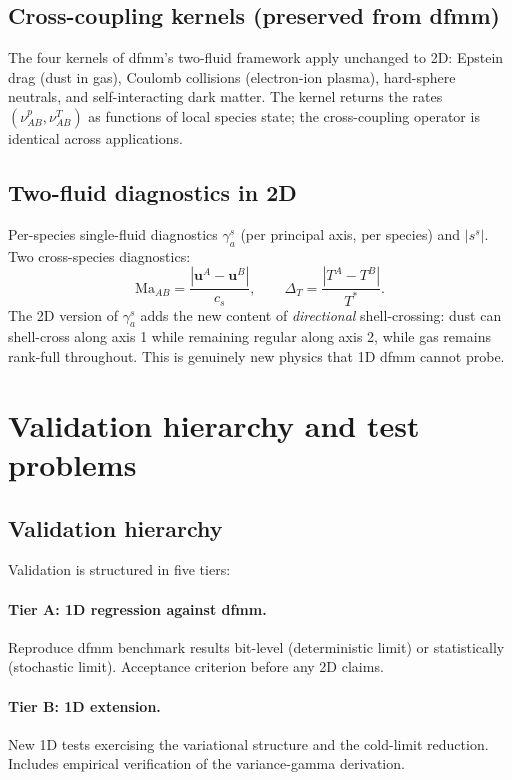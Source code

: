 \documentclass[11pt]{article}
\newcommand{\Ma}{\mathrm{Ma}}
\newcommand{\bu}{\bm{u}}
\begin{document}
\subsection{Cross-coupling kernels (preserved from dfmm)}

The four kernels of dfmm's two-fluid framework apply unchanged to 2D:
Epstein drag (dust in gas), Coulomb collisions (electron-ion plasma),
hard-sphere neutrals, and self-interacting dark matter. The kernel
returns the rates $(\nu^p_{AB}, \nu^T_{AB})$ as functions of local
species state; the cross-coupling operator is identical across
applications.

\subsection{Two-fluid diagnostics in 2D}

Per-species single-fluid diagnostics $\gamma_a^s$ (per principal
axis, per species) and $|s^s|$. Two cross-species diagnostics:
\begin{equation}
  \Ma_{AB} = \frac{|\bu^A - \bu^B|}{c_s},\qquad
  \Delta_T = \frac{|T^A - T^B|}{T^*}.
\end{equation}
The 2D version of $\gamma_a^s$ adds the new content of \emph{directional}
shell-crossing: dust can shell-cross along axis 1 while remaining
regular along axis 2, while gas remains rank-full throughout. This
is genuinely new physics that 1D dfmm cannot probe.

\section{Validation hierarchy and test problems}
\label{sec:validation}

\subsection{Validation hierarchy}

Validation is structured in five tiers:

\paragraph{Tier A: 1D regression against dfmm.} Reproduce dfmm
benchmark results bit-level (deterministic limit) or statistically
(stochastic limit). Acceptance criterion before any 2D claims.

\paragraph{Tier B: 1D extension.} New 1D tests exercising the
variational structure and the cold-limit reduction. Includes
empirical verification of the variance-gamma derivation.
\end{document}
